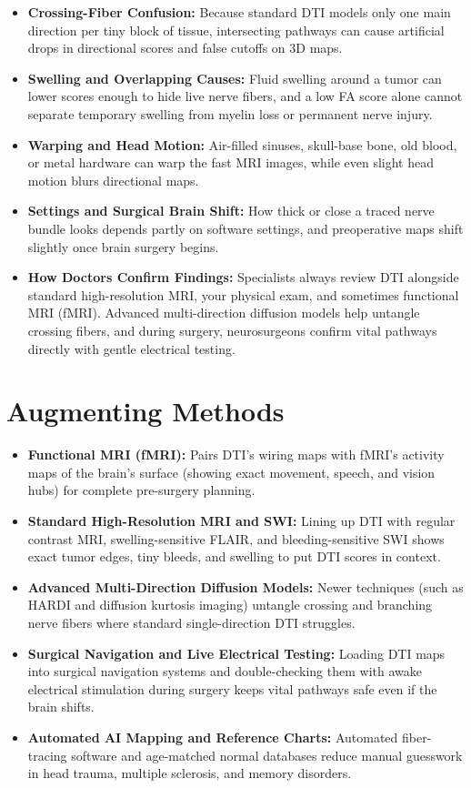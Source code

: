 \begin{itemize}
    \item \textbf{Crossing-Fiber Confusion:} Because standard DTI models only one main direction per tiny block of tissue, intersecting pathways can cause artificial drops in directional scores and false cutoffs on 3D maps.
    \item \textbf{Swelling and Overlapping Causes:} Fluid swelling around a tumor can lower scores enough to hide live nerve fibers, and a low FA score alone cannot separate temporary swelling from myelin loss or permanent nerve injury.
    \item \textbf{Warping and Head Motion:} Air-filled sinuses, skull-base bone, old blood, or metal hardware can warp the fast MRI images, while even slight head motion blurs directional maps.
    \item \textbf{Settings and Surgical Brain Shift:} How thick or close a traced nerve bundle looks depends partly on software settings, and preoperative maps shift slightly once brain surgery begins.
    \item \textbf{How Doctors Confirm Findings:} Specialists always review DTI alongside standard high-resolution MRI, your physical exam, and sometimes functional MRI (fMRI). Advanced multi-direction diffusion models help untangle crossing fibers, and during surgery, neurosurgeons confirm vital pathways directly with gentle electrical testing.
\end{itemize}

\section{Augmenting Methods}

\begin{itemize}
    \item \textbf{Functional MRI (fMRI):} Pairs DTI's wiring maps with fMRI's activity maps of the brain's surface (showing exact movement, speech, and vision hubs) for complete pre-surgery planning.
    \item \textbf{Standard High-Resolution MRI and SWI:} Lining up DTI with regular contrast MRI, swelling-sensitive FLAIR, and bleeding-sensitive SWI shows exact tumor edges, tiny bleeds, and swelling to put DTI scores in context.
    \item \textbf{Advanced Multi-Direction Diffusion Models:} Newer techniques (such as HARDI and diffusion kurtosis imaging) untangle crossing and branching nerve fibers where standard single-direction DTI struggles.
    \item \textbf{Surgical Navigation and Live Electrical Testing:} Loading DTI maps into surgical navigation systems and double-checking them with awake electrical stimulation during surgery keeps vital pathways safe even if the brain shifts.
    \item \textbf{Automated AI Mapping and Reference Charts:} Automated fiber-tracing software and age-matched normal databases reduce manual guesswork in head trauma, multiple sclerosis, and memory disorders.
\end{itemize}

